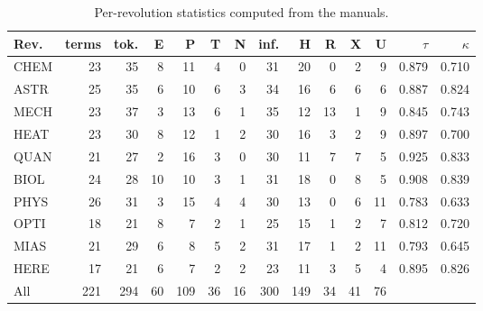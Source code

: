 \begin{table}[!htb]\centering\footnotesize\setlength{\tabcolsep}{3.2pt}
\caption{Per-revolution statistics computed from the manuals.}\label{tab:stats}
\begin{tabular}{@{}lrrrrrrrrrrrrr@{}}\toprule
Rev. & terms & tok. & E & P & T & N & inf. & H & R & X & U & $\tau$ & $\kappa$\\\midrule
CHEM & 23 & 35 & 8 & 11 & 4 & 0 & 31 & 20 & 0 & 2 & 9 & 0.879 & 0.710\\
ASTR & 25 & 35 & 6 & 10 & 6 & 3 & 34 & 16 & 6 & 6 & 6 & 0.887 & 0.824\\
MECH & 23 & 37 & 3 & 13 & 6 & 1 & 35 & 12 & 13 & 1 & 9 & 0.845 & 0.743\\
HEAT & 23 & 30 & 8 & 12 & 1 & 2 & 30 & 16 & 3 & 2 & 9 & 0.897 & 0.700\\
QUAN & 21 & 27 & 2 & 16 & 3 & 0 & 30 & 11 & 7 & 7 & 5 & 0.925 & 0.833\\
BIOL & 24 & 28 & 10 & 10 & 3 & 1 & 31 & 18 & 0 & 8 & 5 & 0.908 & 0.839\\
PHYS & 26 & 31 & 3 & 15 & 4 & 4 & 30 & 13 & 0 & 6 & 11 & 0.783 & 0.633\\
OPTI & 18 & 21 & 8 & 7 & 2 & 1 & 25 & 15 & 1 & 2 & 7 & 0.812 & 0.720\\
MIAS & 21 & 29 & 6 & 8 & 5 & 2 & 31 & 17 & 1 & 2 & 11 & 0.793 & 0.645\\
HERE & 17 & 21 & 6 & 7 & 2 & 2 & 23 & 11 & 3 & 5 & 4 & 0.895 & 0.826\\
\midrule
All & 221 & 294 & 60 & 109 & 36 & 16 & 300 & 149 & 34 & 41 & 76 & & \\\bottomrule\end{tabular}\end{table}

